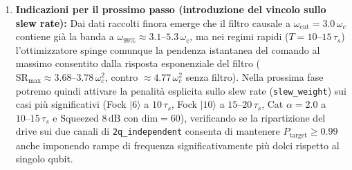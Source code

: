 \documentclass[11pt,a4paper]{article}
\begin{document}
\begin{enumerate}
    \item \textbf{Indicazioni per il prossimo passo (introduzione del vincolo sullo slew rate):}
    Dai dati raccolti finora emerge che il filtro causale a $\omega_{\text{cut}} = 3.0\,\omega_c$ contiene già la banda a $\omega_{99\%} \approx 3.1\text{--}5.3\,\omega_c$, ma nei regimi rapidi ($T = 10\text{--}15\,\tau_s$) l'ottimizzatore spinge comunque la pendenza istantanea del comando al massimo consentito dalla risposta esponenziale del filtro ($\text{SR}_{\max} \approx 3.68\text{--}3.78\,\omega_c^2$, contro $\approx 4.77\,\omega_c^2$ senza filtro). Nella prossima fase potremo quindi attivare la penalità esplicita sullo slew rate (\texttt{slew\_weight}) sui casi più significativi (Fock $|6\rangle$ a $10\,\tau_s$, Fock $|10\rangle$ a $15\text{--}20\,\tau_s$, Cat $\alpha=2.0$ a $10\text{--}15\,\tau_s$ e Squeezed $8\,\text{dB}$ con $\text{dim}=60$), verificando se la ripartizione del drive sui due canali di \texttt{2q\_independent} consenta di mantenere $P_{\text{target}} \ge 0.99$ anche imponendo rampe di frequenza significativamente più dolci rispetto al singolo qubit.
\end{enumerate}
\end{document}
